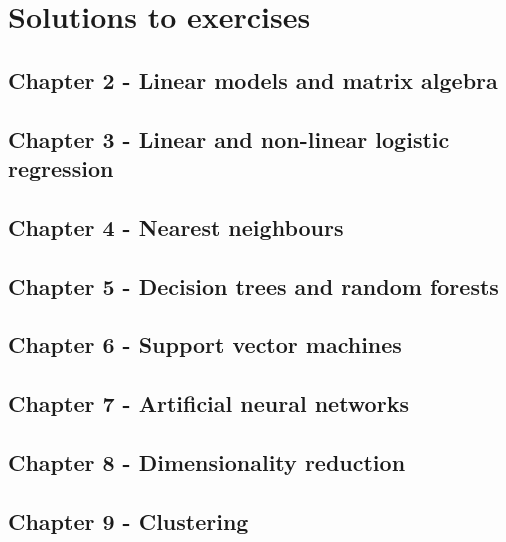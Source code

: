 \documentclass[]{book}
\theoremstyle{definition}
\theoremstyle{definition}
\theoremstyle{definition}
\theoremstyle{remark}
\begin{document}
\chapter{Solutions to exercises}\label{solutions-to-exercises}

\section{Chapter 2 - Linear models and matrix
algebra}\label{solutions-linear-models}

\section{Chapter 3 - Linear and non-linear logistic
regression}\label{solutions-logistic-regression}

\section{Chapter 4 - Nearest
neighbours}\label{solutions-nearest-neighbours}

\section{Chapter 5 - Decision trees and random
forests}\label{solutions-decision-trees}

\section{Chapter 6 - Support vector machines}\label{solutions-svm}

\section{Chapter 7 - Artificial neural networks}\label{solutions-ann}

\section{Chapter 8 - Dimensionality
reduction}\label{solutions-dimensionality-reduction}

\section{Chapter 9 - Clustering}\label{solutions-clustering}


\end{document}
